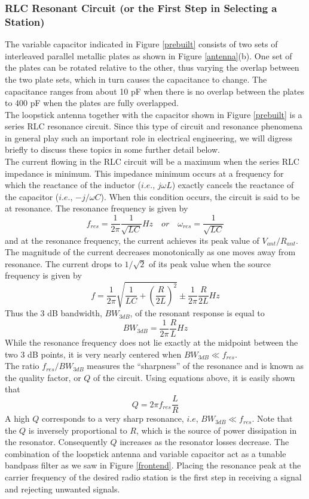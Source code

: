 \documentclass{article}
\begin{document}
\subsubsection{RLC Resonant Circuit (or the First Step in Selecting a Station)}
The variable capacitor indicated in Figure \ref{prebuilt} consists of two sets of interleaved parallel metallic plates as shown in Figure \ref{antenna}(b). One set of the plates can be rotated relative to the other, thus varying the overlap between the two plate sets, which in turn causes the capacitance to change. The capacitance ranges from about 10 pF when there is no overlap between the plates to 400 pF when the plates are fully overlapped.\\
The loopstick antenna together with the capacitor shown in Figure \ref{prebuilt} is a series RLC resonance circuit. Since this type of circuit and resonance phenomena in general play such an important role in electrical engineering, we will digress briefly to discuss these topics in some further detail below.\\
The current flowing in the RLC circuit will be a maximum when the series RLC impedance is minimum. This impedance minimum occurs at a frequency for which the reactance of the inductor ($i.e.$, $j\omega L$) exactly cancels the reactance of the capacitor ($i.e.$, $−j/\omega C$). When this condition occurs, the circuit is said to be at resonance. The resonance frequency is given by
$$f_{res} = \frac{1}{2\pi}\frac{1}{\sqrt{LC}}Hz \quad or \quad \omega_{res} = \frac{1}{\sqrt{LC}}$$
and at the resonance frequency, the current achieves its peak value of $V_{ant}/R_{ant}$. The magnitude of the current decreases monotonically as one moves away from resonance. The current drops to $1/\sqrt{2}$ of its peak value when the source frequency is given by
$$ f = \frac{1}{2\pi}\sqrt{\frac{1}{LC}+(\frac{R}{2L})^2} \pm \frac{1}{2\pi}\frac{R}{2L} Hz$$
Thus the 3 dB bandwidth, $BW_{3dB}$, of the resonant response is equal to
$$BW_{3dB} = \frac{1}{2\pi}\frac{R}{L}Hz$$
While the resonance frequency does not lie exactly at the midpoint between the two 3 dB points, it is very nearly centered when $BW_{3dB}\ll f_{res}$.\\
The ratio $f_{res}/BW_{3dB}$ measures the “sharpness” of the resonance and is known as the quality factor, or $Q$ of the circuit. Using equations above, it is easily shown that
$$Q = 2\pi f_{res}\frac{L}{R}$$
A high $Q$ corresponds to a very sharp resonance, $i.e$, $BW_{3dB}\ll f_{res}$. Note that the $Q$ is inversely proportional to $R$, which is the source of power dissipation in the resonator. Consequently $Q$ increases as the resonator losses decrease. The combination of the loopstick antenna and variable capacitor act as a tunable bandpass filter as we saw in Figure \ref{frontend}. Placing the resonance peak at the carrier frequency of the desired radio station is the first step in receiving a signal and rejecting unwanted signals.\\
\end{document}
